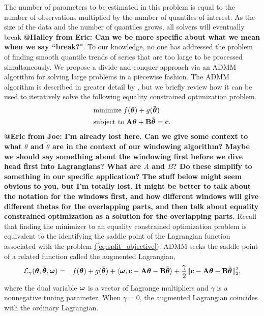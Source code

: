 \documentclass[12pt]{article}
\makeatletter
\newcommand{\Halley}[2]{{\bf {\color{purple}@Halley from #1: #2}}\xspace}
\newcommand{\Eric}[2]{{\bf {\color{green}@Eric from #1: #2}}\xspace}
\newcommand{\Eqn}[1]{\hyperref[eq:#1]{{\rm (\ref*{eq:#1})}}} %
\newcommand{\Eqn}[1]{{(\ref{eq:#1})}} %
\newcommand{\V}[1]{{\bm{\mathbf{\MakeLowercase{#1}}}}} %
\newcommand{\Vtilde}[1]{{\bm{\tilde \mathbf{\MakeLowercase{#1}}}}} %
\newcommand{\M}[1]{{\bm{\mathbf{\MakeUppercase{#1}}}}} %
\makeatother
\begin{document}
The number of parameters to be estimated in this problem is equal to the number of observations multiplied by the number of quantiles of interest. As the size of the data and the number of quantiles grows, all solvers will eventually break \Halley{Eric}{Can we be more specific about what we mean when we say ``break?"}. To our knowledge, no one has addressed the problem of finding smooth quantile trends of series that are too large to be processed simultaneously. We propose a divide-and-conquer approach via an ADMM algorithm for solving large problems in a piecewise fashion. The ADMM algorithm \citep{gabay1975dual, glowinski1975approximation} is  described in greater detail by \cite{boyd2011distributed}, but we briefly review how it can be used to iteratively solve the following equality constrained optimization problem.
\begin{equation}
\label{eq:split_objective}
\begin{split}
&\text{minimize} \; f(\V{\theta}) + g(\Vtilde{\theta}) \\
&\text{subject to} \; \M{A}\V{\theta} + \M{B}\Vtilde{\theta} = \V{c}.
\end{split}
\end{equation}
\Eric{Joe}{I'm already lost here. Can we give some context to what $\theta$ and $\widetilde{\theta}$ are in the context of our windowing algorithm? Maybe we should say something about the windowing first before we dive head first into Lagrangians? What are $A$ and $B$? Do these simplify to something in our specific application? The stuff below might seem obvious to you, but I'm totally lost. It might be better to talk about the notation for the windows first, and how different windows will give different thetas for the overlapping parts, and then talk about equality constrained optimization as a solution for the overlapping parts.} Recall that finding the minimizer to an equality constrained optimization problem is equivalent to the identifying the saddle point of the Lagrangian function associated with the problem \Eqn{split_objective}. ADMM seeks the saddle point of a related function called the augmented Lagrangian,
\begin{eqnarray*}
\mathcal{L}_{\gamma}(\V{\theta},\Vtilde{\theta},\V{\omega}) & = & f(\V{\theta}) + g(\Vtilde{\theta}) + \langle \V{\omega}, \V{c} - \M{A}\V{\theta} - \M{B}\Vtilde{\theta} \rangle
+ \frac{\gamma}{2} \lVert \V{c} - \M{A}\V{\theta} - \M{B}\Vtilde{\theta} \rVert_2^2,
\end{eqnarray*}
where the dual variable $\V{\omega}$ is a vector of Lagrange multipliers and $\gamma$ is a nonnegative tuning parameter. When $\gamma = 0$, the augmented Lagrangian coincides with the ordinary Lagrangian.
\end{document}

